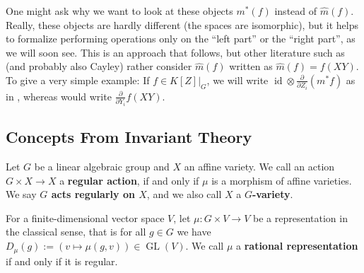 \begin{remark}
One might ask why we want to look at these objects $ m^\ast \left( f \right) $ instead of $ \hat{m} \left( f \right) $.
Really, these objects are hardly different (the spaces are isomorphic), but it helps to formalize performing operations only on the ``left part'' or the ``right part'', as we will soon see.
This is an approach that \cite{DK15} follows, but other literature such as \cite{Stu08} (and probably also Cayley) rather consider $ \hat{m} \left( f \right) $ written as $ \hat{m} \left( f \right) = f (XY) $.
To give a very simple example:
If $f \in \left. K[Z] \right|_G$, we will write $\operatorname{id} \otimes \frac{\partial}{\partial Z_i} (m^\ast f)$ as in \cite{DK15}, whereas \cite{Stu08} would write $\frac{\partial}{\partial Y_i} f(XY)$.
\end{remark}

\subsection{Concepts From Invariant Theory}

\begin{definition}
  Let $G$ be a linear algebraic group and $X$ an affine variety.
  We call an action $G \times X \longrightarrow X$ a \textbf{regular action}, if and only if $\mu$ is a morphism of affine varieties.
  We say \textbf{$ G $ acts regularly on $ X $}, and we also call $X$ a \textbf{$G$-variety}.

  For a finite-dimensional vector space $V$, let $\mu \colon G \times V \longrightarrow V$ be a representation in the classical sense, that is for all $g \in G$ we have $D_\mu (g) := (v \mapsto \mu(g,v)) \in \operatorname{GL}(V)$.
  We call $\mu$ a \textbf{rational representation} if and only if it is regular.
  
\end{definition}

